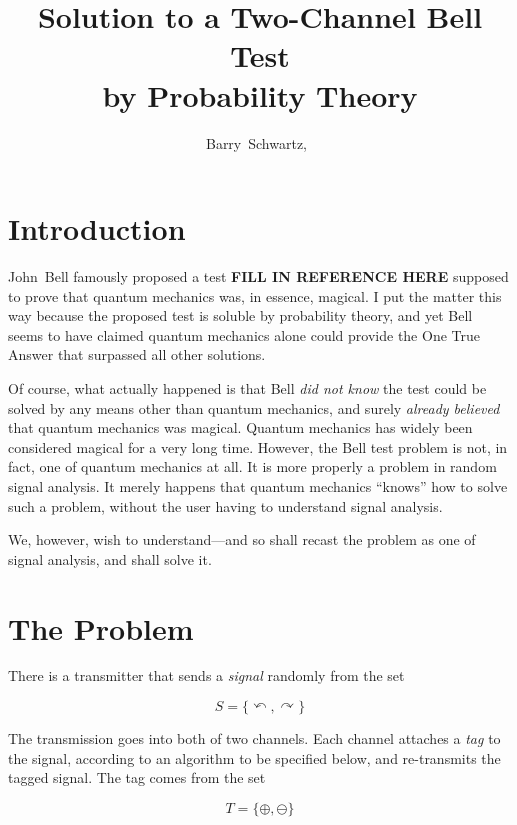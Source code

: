 \documentclass[9pt,technote]{IEEEtran}
\begin{document}
\title{Solution to a Two-Channel Bell Test\\by Probability Theory}
\author{Barry~Schwartz,~}

\maketitle

\section{Introduction}

John~Bell famously proposed a test {\bf{FILL IN REFERENCE HERE}}
supposed to prove that quantum mechanics was, in essence, magical. I
put the matter this way because the proposed test is soluble by
probability theory, and yet Bell seems to have claimed quantum
mechanics alone could provide the One True Answer that surpassed all
other solutions.

Of course, what actually happened is that Bell {\em{did not know}} the
test could be solved by any means other than quantum mechanics, and
surely {\em{already believed}} that quantum mechanics was
magical. Quantum mechanics has widely been considered magical for a
very long time. However, the Bell test problem is not, in fact, one of
quantum mechanics at all. It is more properly a problem in random
signal analysis. It merely happens that quantum mechanics ``knows''
how to solve such a problem, without the user having to understand
signal analysis.

We, however, wish to understand---and so shall recast the problem as
one of signal analysis, and shall solve it.

\section{The Problem}

There is a transmitter that sends a {\em{signal}} randomly from the
set

\begin{equation}
  S=\{\curvearrowleft,\curvearrowright\}
\end{equation}

The transmission goes into both of two channels. Each channel attaches
a {\em{tag}} to the signal, according to an algorithm to be specified
below, and re-transmits the tagged signal. The tag comes from the set

\begin{equation}
  T=\{\oplus,\ominus\}
\end{equation}
\end{document}
